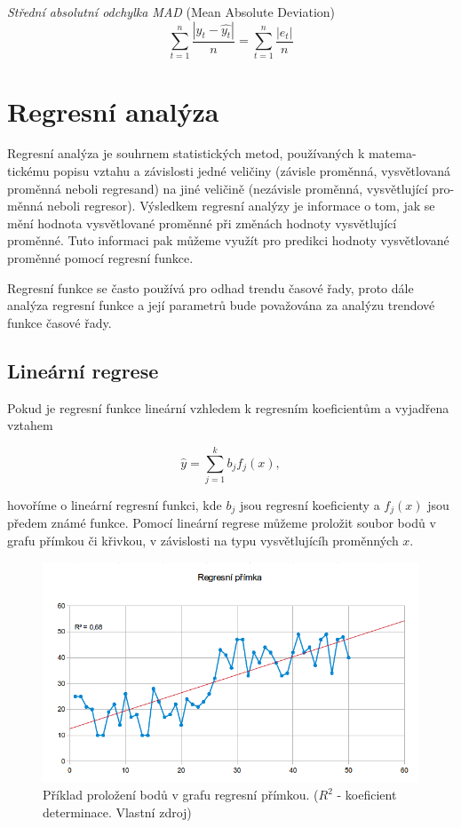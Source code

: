 \documentclass[a4paper,12pt,twoside]{scrreprt}
\begin{document}
\textit{Střední absolutní odchylka MAD} (Mean Absolute Deviation)
\begin{equation}
\sum_{t=1}^{n}\frac{|y_t - \hat{y_t}|}{n} = \sum_{t=1}^{n}\frac{|e_t|}{n}
\end{equation}

\newpage
\section{Regresní analýza}
\vspace{0.5cm}

Regresní analýza je souhrnem statistických metod, používaných k matema-tickému popisu vztahu a závislosti jedné veličiny (závisle proměnná, vysvětlovaná proměnná neboli regresand) na jiné veličině (nezávisle proměnná, vysvětlující pro-měnná neboli regresor). Výsledkem regresní analýzy je informace o tom, jak se mění hodnota vysvětlované proměnné při změnách hodnoty vysvětlující proměnné. Tuto informaci pak můžeme využít pro predikci hodnoty vysvětlované proměnné pomocí regresní funkce. 

Regresní funkce se často používá pro odhad trendu časové řady, proto dále analýza regresní funkce a její parametrů bude považována za analýzu trendové funkce časové řady.

\subsection{Lineární regrese}

Pokud je regresní funkce lineární vzhledem k regresním koeficientům a vyjadřena vztahem 

\begin{equation}
\hat{y} = \sum_{j=1}^{k}b_jf_j(x),
\end{equation}

hovoříme o lineární regresní funkci, kde \textit{$b_j$} jsou regresní koeficienty a \textit{$f_j$}$(x)$ jsou předem známé funkce. Pomocí lineární regrese můžeme proložit soubor bodů v grafu přímkou či křivkou, v závislosti na typu vysvětlujícíh proměnných $x$. 

\begin{figure}[h]
  \centering
  \includegraphics[width=15cm]{pictures/primka.png}
  \caption{Příklad proložení bodů v grafu regresní přímkou. \newline($R^2$ - koeficient determinace. Vlastní zdroj)}
  \label{fig:přímka}
\end{figure}
\end{document}
